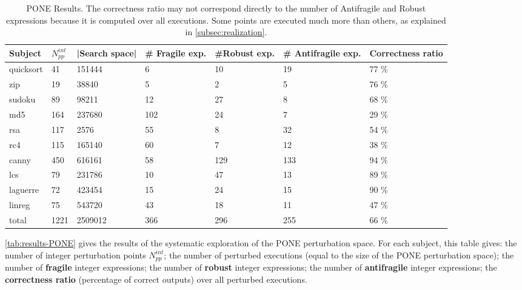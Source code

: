 \begin{table}[h]
	\caption{PONE Results. The correctness ratio may not correspond directly to the number of Antifragile and Robust expressions because it is computed over all executions. Some points are executed much more than others, as explained in \autoref{subsec:realization}.}
	\label{tab:results-PONE}
	\def\arraystretch{0.55}%
	\setlength\tabcolsep{0.45pt} %
	\centering\begin{tabular}{lllllll}
		Subject & $N^{int}_{pp}$ & |Search space| & \# Fragile exp. & \#Robust exp.& \# Antifragile exp. & Correctness ratio\\
		\hline
		quicksort&41&151444&6&10&19&\textendash\textendash\textendash\textendash\textendash\textendash\textendash { }  77 \%\\
		zip&19&38840&5&2&5&\textendash\textendash\textendash\textendash\textendash\textendash\textendash { }  76 \%\\
		sudoku&89&98211&12&27&8&\textendash\textendash\textendash\textendash\textendash\textendash { }  68 \%\\
		md5&164&237680&102&24&7&\textendash\textendash { }  29 \%\\
		rsa&117&2576&55&8&32&\textendash\textendash\textendash\textendash\textendash { }  54 \%\\
		rc4&115&165140&60&7&12&\textendash\textendash\textendash { }  38 \%\\
		canny&450&616161&58&129&133&\textendash\textendash\textendash\textendash\textendash\textendash\textendash\textendash\textendash { }  94 \%\\
		lcs&79&231786&10&47&13&\textendash\textendash\textendash\textendash\textendash\textendash\textendash\textendash { }  89 \%\\
		laguerre&72&423454&15&24&15&\textendash\textendash\textendash\textendash\textendash\textendash\textendash\textendash\textendash { }  90 \%\\
		linreg&75&543720&43&18&11&\textendash\textendash\textendash\textendash { }  47 \%\\
		total & 1221&2509012&366&296&255&\textendash\textendash\textendash\textendash\textendash\textendash { }  66 \%
	\end{tabular}
\end{table}

\autoref{tab:results-PONE} gives the results of the systematic exploration of the PONE perturbation space.
For each subject, this table gives:
the number of integer perturbation points $N^{int}_{pp}$;
the number of perturbed executions (equal to the size of the PONE perturbation space);
the number of \textbf{fragile} integer expressions;
the number of \textbf{robust} integer expressions;
the number of \textbf{antifragile} integer expressions;
the \textbf{correctness ratio} (percentage of correct outputs) over all perturbed executions.

